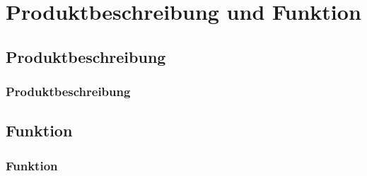 \section{Produktbeschreibung und Funktion} %
\subsection{Produktbeschreibung}
\begin{frame}
    \frametitle{Produktbeschreibung}
\end{frame}
\subsection{Funktion}
\begin{frame}
    \frametitle{Funktion}
\end{frame}
